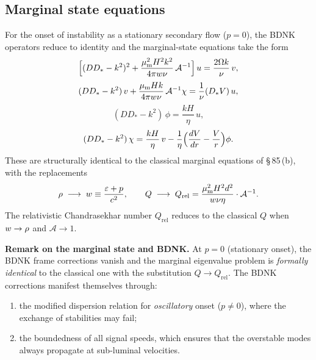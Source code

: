 \subsection{Marginal state equations}
\label{sec:rel-87-marginal}

For the onset of instability as a stationary secondary flow ($p = 0$),
the BDNK operators reduce to identity and the marginal-state
equations take the form
\begin{equation}
  \Bigl[(DD_*-k^2)^2
    + \frac{\mu_{\mathrm{m}}^2 H^2 k^2}{4\pi w\nu}
      \,\mathcal{A}^{-1}\Bigr]\,u
  = \frac{2\Omega k}{\nu}\,v,
  \label{eq:rel-9-180R}
\end{equation}
\begin{equation}
  (DD_*-k^2)\,v + \frac{\mu_{\mathrm{m}}Hk}{4\pi w\nu}\,
    \mathcal{A}^{-1}\chi
  = \frac{1}{\nu}(D_*V)\,u,
  \label{eq:rel-9-177R}
\end{equation}
\begin{equation}
  (DD_*-k^2)\,\phi = \frac{kH}{\eta}\,u,
  \label{eq:rel-9-178R}
\end{equation}
\begin{equation}
  (DD_*-k^2)\,\chi = \frac{kH}{\eta}\,v
    - \frac{1}{\eta}\Bigl(\frac{dV}{dr}-\frac{V}{r}\Bigr)\phi.
  \label{eq:rel-9-179R}
\end{equation}
These are structurally identical to the classical marginal equations of
\S\,85\,(b), with the replacements
\begin{equation}
  \rho \;\longrightarrow\; w \equiv \frac{\varepsilon+p}{c^2},
  \qquad
  Q \;\longrightarrow\; Q_{\mathrm{rel}}
    = \frac{\mu_{\mathrm{m}}^2 H^2 d^2}{w\nu\eta}
      \cdot \mathcal{A}^{-1}.
  \label{eq:rel-9-Qrel}
\end{equation}
The relativistic Chandrasekhar number $Q_{\mathrm{rel}}$ reduces to
the classical $Q$ when $w\to\rho$ and $\mathcal{A}\to 1$.

\medskip
\noindent\textbf{Remark on the marginal state and BDNK.}
At $p=0$ (stationary onset), the BDNK frame corrections vanish and the marginal
eigenvalue problem is \emph{formally identical} to the classical one
with the substitution $Q\to Q_{\mathrm{rel}}$.  The BDNK
corrections manifest themselves through:
\begin{enumerate}
\item[(i)] the modified dispersion relation for \emph{oscillatory} onset
  ($p\ne 0$), where the exchange of stabilities may fail;
\item[(ii)] the boundedness of all signal speeds, which ensures that
  the overstable modes always propagate at sub-luminal velocities.
\end{enumerate}


